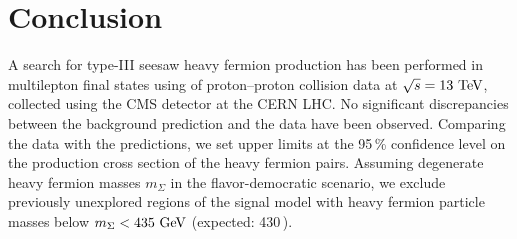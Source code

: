 \chapter{Conclusion}
\label{sec:Summary}

A search for type-III seesaw heavy fermion production has been performed in multilepton final states using \fullLumi of proton--proton collision data at $\sqrt{s} = 13\,\,\text{Te\hspace{-.08em}V}$, collected using the CMS detector at the CERN LHC. No significant discrepancies between the background prediction and the data have been observed. Comparing the data with the predictions, we set upper limits at the 95\,\% confidence level on the production cross section of the heavy fermion pairs. Assuming degenerate heavy fermion masses $m_\Sigma$ in the flavor-democratic scenario, we exclude previously unexplored regions of the signal model with heavy fermion particle masses below $m_\Sigma < 435\,\,\text{Ge\hspace{-.08em}V}$ (expected: 430\,\GeV).
